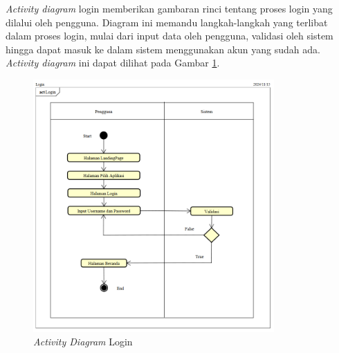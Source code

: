 \textit{Activity diagram} login memberikan gambaran rinci tentang proses login yang dilalui oleh pengguna. Diagram ini memandu langkah-langkah yang terlibat dalam proses login, mulai dari input data oleh pengguna, validasi oleh sistem hingga dapat masuk ke dalam sistem menggunakan akun yang sudah ada. \textit{Activity diagram} ini dapat dilihat pada Gambar \ref{activity-diagram-login}.
\begin{figure}
	\centering
	\includegraphics[width=0.82\textwidth]{konten/gambar/activity-diagram/login.png}
	\caption{\textit{Activity Diagram} Login}
	\label{activity-diagram-login}
\end{figure}


